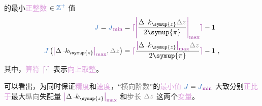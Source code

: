 的最小\textcolor{Plum}{正整数} $\in \textcolor{NavyBlue}{\displaystyle \mathbb {Z} ^{+}}$ 值
\begin{subequations} \label{eq:Chord-accuracy-J-min}
	\begin{align}
		\textcolor{NavyBlue}{J} = \textcolor{NavyBlue}{J}_{\textcolor{Plum}{\min}} &= \textcolor{Plum}{\lceil \textcolor{black}{\textcolor{Plum}{\left| \textcolor{black}{\frac{ \Delta \xint{\begin{smallmatrix} ~ \\ {}^{}_{\mathcolor{gray}{-}} \\ ~ \end{smallmatrix}}{15}{k}_{\symup{z}} \mathcolor{gray}{\Delta z} }{ 2 \symup{\pi} }} \right|_{\max}}} \rceil} - 1 \label{eq:Chord-accuracy-J-min-a} \\ \textcolor{NavyBlue}{J} \left( \textcolor{Plum}{\left| \textcolor{black}{\Delta \xint{\begin{smallmatrix} ~ \\ {}^{}_{\mathcolor{gray}{-}} \\ ~ \end{smallmatrix}}{15}{k}_{\symup{z}}} \right|_{\max}}, \mathcolor{gray}{\Delta z} \right) &= \textcolor{Plum}{\lceil \textcolor{black}{\frac{ \textcolor{Plum}{\left| \textcolor{black}{\Delta \xint{\begin{smallmatrix} ~ \\ {}^{}_{\mathcolor{gray}{-}} \\ ~ \end{smallmatrix}}{15}{k}_{\symup{z}}} \right|_{\max}} \mathcolor{gray}{\Delta z} }{ 2 \symup{\pi} }} \rceil} - 1 \label{eq:Chord-accuracy-J-min-b} ~,
	\end{align}
\end{subequations}
其中，\textcolor{Plum}{算符} $\textcolor{Plum}{\lceil \textcolor{black}{\cdot} \rceil}$ 表示\textcolor{Plum}{向上取整}。

可以看出，为同时保证\textcolor{Plum}{精度}和\textcolor{Plum}{速度}，“\textcolor{gray}{横向阶数}”的\textcolor{Plum}{最小值} $\textcolor{NavyBlue}{J} = \textcolor{NavyBlue}{J}_{\textcolor{Plum}{\min}}$ 大致分别\textcolor{Plum}{正比于}最大\textcolor{gray}{纵向}\textcolor{PineGreen}{失配量} $\textcolor{Plum}{\left|\textcolor{black}{\Delta \xint{\begin{smallmatrix} ~ \\ {}^{}_{\mathcolor{gray}{-}} \\ ~ \end{smallmatrix}}{15}{k}_{\symup{z}}}\right|_{\max}}$ 和\textcolor{gray}{步长} $\mathcolor{gray}{\Delta z}$ 这两个\textcolor{Plum}{变量}。

